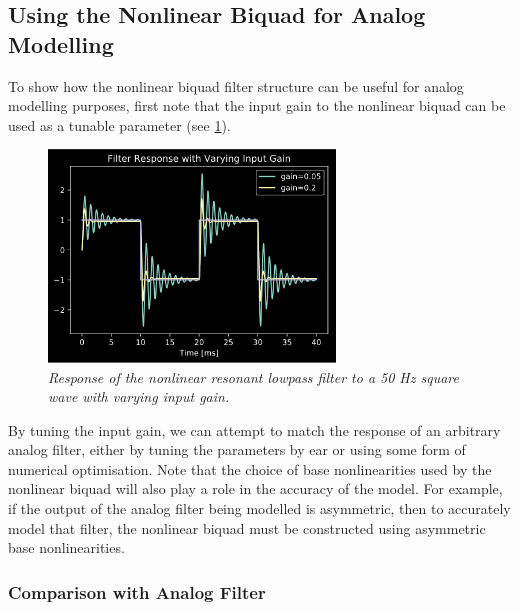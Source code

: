 \documentclass[twoside,a4paper]{article}
\begin{document}
\subsection{Using the Nonlinear Biquad for Analog Modelling}
%
To show how the nonlinear biquad filter structure can be useful
for analog modelling purposes, first note that the input gain to
the nonlinear biquad can be used as a tunable parameter (see \cref{50hz}).
\newline\newline
%
\begin{figure}[h]
    \center
    \includegraphics[width=3in]{../Pics/50-Hz_Response.png}
    \caption{\label{50hz}{\it Response of the nonlinear resonant lowpass
                            filter to a 50 Hz square wave with varying input gain.}}
\end{figure}
%
By tuning the input gain, we can attempt to match the response of an
arbitrary analog filter, either by tuning the parameters by ear
or using some form of numerical optimisation. Note that the choice
of base nonlinearities used by the nonlinear biquad will also play a
role in the accuracy of the model. For example, if the output of the
analog filter being modelled is asymmetric, then to accurately model
that filter, the nonlinear biquad must be constructed using
asymmetric base nonlinearities.
%

\subsubsection{Comparison with Analog Filter}
\end{document}
